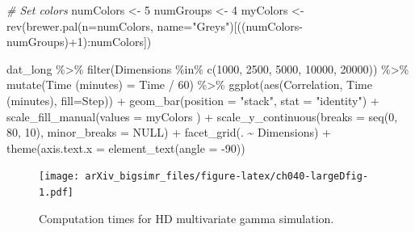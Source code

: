 \documentclass{article}
\newenvironment{Shaded}{\begin{snugshade}}{\end{snugshade}}
\newcommand{\AttributeTok}[1]{\textcolor[rgb]{0.77,0.63,0.00}{#1}}
\newcommand{\CommentTok}[1]{\textcolor[rgb]{0.56,0.35,0.01}{\textit{#1}}}
\newcommand{\ConstantTok}[1]{\textcolor[rgb]{0.00,0.00,0.00}{#1}}
\newcommand{\DecValTok}[1]{\textcolor[rgb]{0.00,0.00,0.81}{#1}}
\newcommand{\FunctionTok}[1]{\textcolor[rgb]{0.00,0.00,0.00}{#1}}
\newcommand{\NormalTok}[1]{#1}
\newcommand{\OtherTok}[1]{\textcolor[rgb]{0.56,0.35,0.01}{#1}}
\newcommand{\SpecialCharTok}[1]{\textcolor[rgb]{0.00,0.00,0.00}{#1}}
\newcommand{\StringTok}[1]{\textcolor[rgb]{0.31,0.60,0.02}{#1}}
\begin{document}
\begin{Shaded}
\begin{Highlighting}[]
\CommentTok{\# Set colors}
\NormalTok{numColors }\OtherTok{\textless{}{-}} \DecValTok{5}
\NormalTok{numGroups }\OtherTok{\textless{}{-}} \DecValTok{4}
\NormalTok{myColors }\OtherTok{\textless{}{-}} \FunctionTok{rev}\NormalTok{(}\FunctionTok{brewer.pal}\NormalTok{(}\AttributeTok{n=}\NormalTok{numColors, }\AttributeTok{name=}\StringTok{"Greys"}\NormalTok{)[((numColors}\SpecialCharTok{{-}}\NormalTok{numGroups)}\SpecialCharTok{+}\DecValTok{1}\NormalTok{)}\SpecialCharTok{:}\NormalTok{numColors])}

\NormalTok{dat\_long }\SpecialCharTok{\%\textgreater{}\%}
    \FunctionTok{filter}\NormalTok{(Dimensions }\SpecialCharTok{\%in\%} \FunctionTok{c}\NormalTok{(}\DecValTok{1000}\NormalTok{, }\DecValTok{2500}\NormalTok{, }\DecValTok{5000}\NormalTok{, }\DecValTok{10000}\NormalTok{, }\DecValTok{20000}\NormalTok{)) }\SpecialCharTok{\%\textgreater{}\%}
    \FunctionTok{mutate}\NormalTok{(}\StringTok{\textasciigrave{}}\AttributeTok{Time (minutes)}\StringTok{\textasciigrave{}} \OtherTok{=}\NormalTok{ Time }\SpecialCharTok{/} \DecValTok{60}\NormalTok{) }\SpecialCharTok{\%\textgreater{}\%}
    \FunctionTok{ggplot}\NormalTok{(}\FunctionTok{aes}\NormalTok{(Correlation, }\StringTok{\textasciigrave{}}\AttributeTok{Time (minutes)}\StringTok{\textasciigrave{}}\NormalTok{, }\AttributeTok{fill=}\NormalTok{Step)) }\SpecialCharTok{+}
    \FunctionTok{geom\_bar}\NormalTok{(}\AttributeTok{position =} \StringTok{"stack"}\NormalTok{, }\AttributeTok{stat =} \StringTok{"identity"}\NormalTok{) }\SpecialCharTok{+}
    \FunctionTok{scale\_fill\_manual}\NormalTok{(}\AttributeTok{values =}\NormalTok{ myColors ) }\SpecialCharTok{+}
    \FunctionTok{scale\_y\_continuous}\NormalTok{(}\AttributeTok{breaks =} \FunctionTok{seq}\NormalTok{(}\DecValTok{0}\NormalTok{, }\DecValTok{80}\NormalTok{, }\DecValTok{10}\NormalTok{),}
                     \AttributeTok{minor\_breaks =} \ConstantTok{NULL}\NormalTok{) }\SpecialCharTok{+}
    \FunctionTok{facet\_grid}\NormalTok{(. }\SpecialCharTok{\textasciitilde{}}\NormalTok{ Dimensions) }\SpecialCharTok{+}
    \FunctionTok{theme}\NormalTok{(}\AttributeTok{axis.text.x =} \FunctionTok{element\_text}\NormalTok{(}\AttributeTok{angle =} \SpecialCharTok{{-}}\DecValTok{90}\NormalTok{))}
\end{Highlighting}
\end{Shaded}

\begin{figure}
\centering
\texttt{[image: arXiv\_bigsimr\_files/figure-latex/ch040-largeDfig-1.pdf]}
\caption{Computation times for HD multivariate gamma simulation.}
\end{figure}
\end{document}
